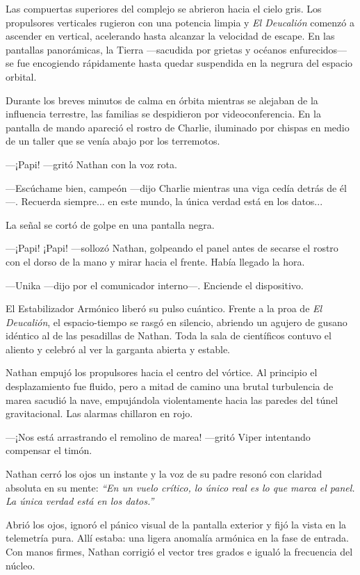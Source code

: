 \documentclass[12pt,a4paper]{book}
\begin{document}
Las compuertas superiores del complejo se abrieron hacia el cielo gris. Los propulsores verticales rugieron con una potencia limpia y \textit{El Deucalión} comenzó a ascender en vertical, acelerando hasta alcanzar la velocidad de escape. En las pantallas panorámicas, la Tierra ---sacudida por grietas y océanos enfurecidos--- se fue encogiendo rápidamente hasta quedar suspendida en la negrura del espacio orbital.

Durante los breves minutos de calma en órbita mientras se alejaban de la influencia terrestre, las familias se despidieron por videoconferencia. En la pantalla de mando apareció el rostro de Charlie, iluminado por chispas en medio de un taller que se venía abajo por los terremotos.

---¡Papi! ---gritó Nathan con la voz rota.

---Escúchame bien, campeón ---dijo Charlie mientras una viga cedía detrás de él---. Recuerda siempre... en este mundo, la única verdad está en los datos...

La señal se cortó de golpe en una pantalla negra.

---¡Papi! ¡Papi! ---sollozó Nathan, golpeando el panel antes de secarse el rostro con el dorso de la mano y mirar hacia el frente. Había llegado la hora.

---Unika ---dijo por el comunicador interno---. Enciende el dispositivo.

El Estabilizador Armónico liberó su pulso cuántico. Frente a la proa de \textit{El Deucalión}, el espacio-tiempo se rasgó en silencio, abriendo un agujero de gusano idéntico al de las pesadillas de Nathan. Toda la sala de científicos contuvo el aliento y celebró al ver la garganta abierta y estable.

Nathan empujó los propulsores hacia el centro del vórtice. Al principio el desplazamiento fue fluido, pero a mitad de camino una brutal turbulencia de marea sacudió la nave, empujándola violentamente hacia las paredes del túnel gravitacional. Las alarmas chillaron en rojo.

---¡Nos está arrastrando el remolino de marea! ---gritó Viper intentando compensar el timón.

Nathan cerró los ojos un instante y la voz de su padre resonó con claridad absoluta en su mente: \textit{``En un vuelo crítico, lo único real es lo que marca el panel. La única verdad está en los datos.''}

Abrió los ojos, ignoró el pánico visual de la pantalla exterior y fijó la vista en la telemetría pura. Allí estaba: una ligera anomalía armónica en la fase de entrada. Con manos firmes, Nathan corrigió el vector tres grados e igualó la frecuencia del núcleo.
\end{document}
